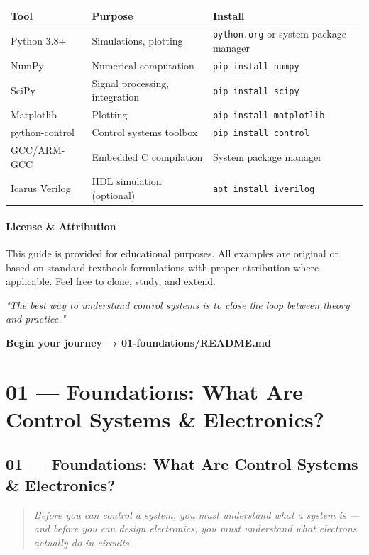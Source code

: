 \documentclass[11pt,a4paper]{book}
\begin{document}
\begin{center}
\begin{tabular}{|l|l|l|}
\hline
Tool & Purpose & Install \\
\hline
Python 3.8+ & Simulations, plotting & \texttt{python.org} or system package manager \\
NumPy & Numerical computation & \texttt{pip install numpy} \\
SciPy & Signal processing, integration & \texttt{pip install scipy} \\
Matplotlib & Plotting & \texttt{pip install matplotlib} \\
python-control & Control systems toolbox & \texttt{pip install control} \\
GCC/ARM-GCC & Embedded C compilation & System package manager \\
Icarus Verilog & HDL simulation (optional) & \texttt{apt install iverilog} \\
\hline
\end{tabular}
\end{center}

\medskip\noindent\hrulefill\medskip

\subsubsection{License & Attribution}

This guide is provided for educational purposes. All examples are original or based on standard textbook formulations with proper attribution where applicable. Feel free to clone, study, and extend.

\medskip\noindent\hrulefill\medskip

\textit{"The best way to understand control systems is to close the loop between theory and practice."}

\textbf{Begin your journey → 01-foundations/README.md}


\chapter{01 — Foundations: What Are Control Systems & Electronics?}
\section{01 — Foundations: What Are Control Systems & Electronics?}

\begin{quote}
\textit{Before you can control a system, you must understand what a system is — and before you can design electronics, you must understand what electrons actually do in circuits.}
\end{quote}
\end{document}
